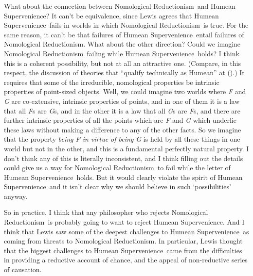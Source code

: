 \documentclass[
  11pt,
  letterpaper,
  DIV=11,
  numbers=noendperiod,
  twoside]{scrartcl}
\begin{document}
What about the connection between Nomological Reductionism~and Humean
Supervenience? It can't be equivalence, since Lewis agrees that Humean
Supervenience~fails in worlds in which Nomological Reductionism~is true.
For the same reason, it can't be that failures of Humean
Supervenience~entail failures of Nomological Reductionism. What about
the other direction? Could we imagine Nomological Reductionism~failing
while Humean Supervenience~holds? I think this is a coherent
possibility, but not at all an attractive one. (Compare, in this
respect, the discussion of theories that ``qualify technically as
Humean'' at ().) It requires
that some of the irreducible, nomological properties be intrinsic
properties of point-sized objects. Well, we could imagine two worlds
where \emph{F} and \emph{G} are co-extensive, intrinsic properties of
points, and in one of them it is a law that all \emph{F}s are \emph{G}s,
and in the other it is a law that all \emph{G}s are \emph{F}s, and there
are further intrinsic properties of all the points which are \emph{F}
and \emph{G} which underlie these laws without making a difference to
any of the other facts. So we imagine that the property \emph{being F in
virtue of being G} is held by all these things in one world but not in
the other, and this is a fundamental perfectly natural property. I don't
think any of this is literally inconsistent, and I think filling out the
details could give us a way for Nomological Reductionism~to fail while
the letter of Humean Supervenience~holds. But it would clearly violate
the spirit of Humean Supervenience  and it isn't clear why we should
believe in such `possibilities' anyway.

So in practice, I think that any philosopher who rejects Nomological
Reductionism~is probably going to want to reject Humean Supervenience.
And I think that Lewis saw some of the deepest challenges to Humean
Supervenience~as coming from threats to Nomological Reductionism. In
particular, Lewis thought that the biggest challenges to Humean
Supervenience~came from the difficulties in providing a reductive
account of chance, and the appeal of non-reductive series of causation.
\end{document}
